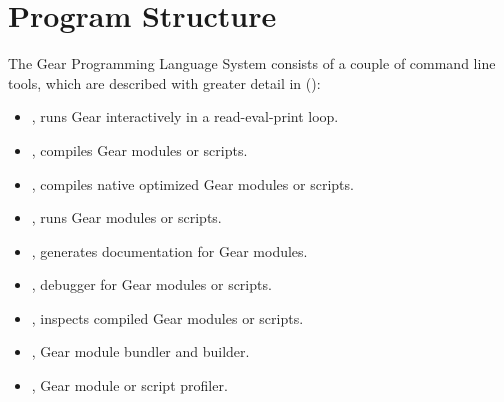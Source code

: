 
\chapter{Program Structure}
\label{sec:program-structure}

The Gear Programming Language System consists of a couple of command line tools, which are described with greater detail in (): 
\begin{itemize}
  \item {}, runs Gear interactively in a read-eval-print loop.
  \item {}, compiles Gear modules or scripts.
  \item {}, compiles native optimized Gear modules or scripts.
  \item {}, runs Gear modules or scripts.
  \item {}, generates documentation for Gear modules. 
  \item {}, debugger for Gear modules or scripts. 
  \item {}, inspects compiled Gear modules or scripts.
  \item {}, Gear module bundler and builder.
  \item {}, Gear module or script profiler.
\end{itemize}


